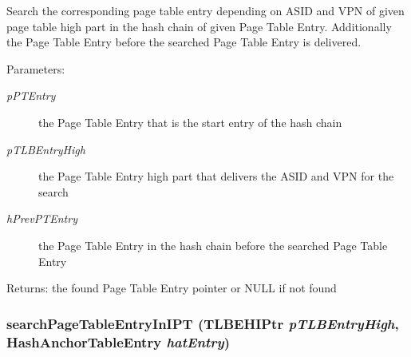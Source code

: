 Search the corresponding page table entry depending on ASID and VPN of given page table high part in the hash chain of given Page Table Entry. Additionally the Page Table Entry before the searched Page Table Entry is delivered. \begin{Desc}
\item[Parameters:]
\begin{description}
\item[{\em pPTEntry}]the Page Table Entry that is the start entry of the hash chain \item[{\em pTLBEntryHigh}]the Page Table Entry high part that delivers the ASID and VPN for the search \item[{\em hPrevPTEntry}]the Page Table Entry in the hash chain before the searched Page Table Entry \end{description}
\end{Desc}
\begin{Desc}
\item[Returns:]the found Page Table Entry pointer or NULL if not found \end{Desc}
\hypertarget{group___v_m_m___i_p_t_g150394a17b25cd9912983172c7b3803a}{
\subsubsection[{searchPageTableEntryInIPT}]{ searchPageTableEntryInIPT ({\bf TLBEHIPtr} {\em pTLBEntryHigh}, \/  {\bf HashAnchorTableEntry} {\em hatEntry})}}
\label{group___v_m_m___i_p_t_g150394a17b25cd9912983172c7b3803a}


